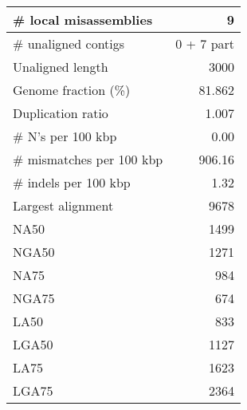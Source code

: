 \documentclass[12pt,a4paper]{article}
\begin{document}
\begin{table}[ht]
\begin{center}
\begin{tabular}{|l*{1}{|r}|}
\# local misassemblies & 9 \\ \hline
\# unaligned contigs & 0 + 7 part \\ \hline
Unaligned length & 3000 \\ \hline
Genome fraction (\%) & 81.862 \\ \hline
Duplication ratio & 1.007 \\ \hline
\# N's per 100 kbp & 0.00 \\ \hline
\# mismatches per 100 kbp & 906.16 \\ \hline
\# indels per 100 kbp & 1.32 \\ \hline
Largest alignment & 9678 \\ \hline
NA50 & 1499 \\ \hline
NGA50 & 1271 \\ \hline
NA75 & 984 \\ \hline
NGA75 & 674 \\ \hline
LA50 & 833 \\ \hline
LGA50 & 1127 \\ \hline
LA75 & 1623 \\ \hline
LGA75 & 2364 \\ \hline
\end{tabular}
\end{center}
\end{table}
\end{document}
